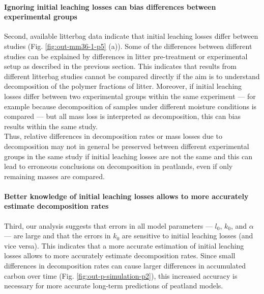 \documentclass[bg, manuscript]{copernicus}
\begin{document}
\paragraph*{Ignoring initial leaching losses can bias differences between experimental groups}

Second, available litterbag data indicate that initial leaching losses differ between studies (Fig. \ref{fig:out-mm36-1-p5} (a)). Some of the differences between different studies can be explained by differences in litter pre-treatment or experimental setup as described in the previous section. This indicates that results from different litterbag studies cannot be compared directly if the aim is to understand decomposition of the polymer fractions of litter. Moreover, if initial leaching losses differ between two experimental groups within the same experiment --- for example because decomposition of samples under different moisture conditions is compared \citep{Lind.2022} --- but all mass loss is interpreted as decomposition, this can bias results within the same study.\\
Thus, relative differences in decomposition rates or mass losses due to decomposition may not in general be preserved between different experimental groups in the same study if initial leaching losses are not the same and this can lead to erroneous conclusions on decomposition in peatlands, even if only remaining masses are compared.

\paragraph*{Better knowledge of initial leaching losses allows to more accurately estimate decomposition rates}

Third, our analysis suggests that errors in all model parameters --- \(l_0\), \(k_0\), and \(\alpha\) --- are large and that the errors in \(k_0\) are sensitive to initial leaching losses (and vice versa). This indicates that a more accurate estimation of initial leaching losses allows to more accurately estimate decomposition rates. Since small differences in decomposition rates can cause larger differences in accumulated carbon over time (Fig. \ref{fig:out-p-simulation-p2}), this increased accuracy is necessary for more accurate long-term predictions of peatland models.
\end{document}

